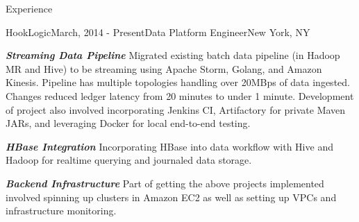 \documentclass{resume} %
\begin{document}
\begin{rSection}{Experience}

    \begin{rSubsection}{HookLogic}{March, 2014 - Present}{Data Platform Engineer}{New York, NY}
    \item \textbf{\textit{Streaming Data Pipeline}} Migrated existing batch data pipeline (in Hadoop MR and Hive) to be streaming using Apache Storm, Golang, and Amazon Kinesis.  Pipeline has multiple topologies handling over 20MBps of data ingested.  Changes reduced ledger latency from 20 minutes to under 1 minute.  Development of project also involved incorporating Jenkins CI, Artifactory for private Maven JARs, and leveraging Docker for local end-to-end testing.
    \item \textbf{\textit{HBase Integration}} Incorporating HBase into data workflow with Hive and Hadoop for realtime querying and journaled data storage.
    \item \textbf{\textit{Backend Infrastructure}} Part of getting the above projects implemented involved spinning up clusters in Amazon EC2 as well as setting up VPCs and infrastructure monitoring.  
   
    \end{rSubsection}


\end{rSection}
\end{document}
